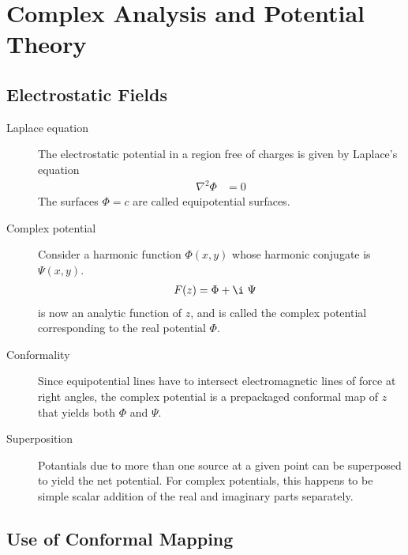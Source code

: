 \chapter{Complex Analysis and Potential Theory}

\section{Electrostatic Fields}

\begin{description}
    \item[Laplace equation] The electrostatic potential in a region free of charges is
        given by Laplace's equation
        \begin{align}
            \nabla^2 \Phi & = 0
        \end{align}
        The surfaces $ \Phi = c $ are called equipotential surfaces.

    \item[Complex potential] Consider a harmonic function $ \Phi(x, y) $ whose
        harmonic conjugate is $ \Psi(x, y) $.
        \begin{align}
            F(z) & = \Phi + \i\ \Psi
        \end{align}
        is now an analytic function of $ z $, and is called the complex potential
        corresponding to the real potential $ \Phi $.

    \item[Conformality] Since equipotential lines have to intersect electromagnetic
        lines of force at right angles, the complex potential is a prepackaged conformal
        map of $ z $ that yields both $ \Phi $ and $ \Psi $.

    \item[Superposition] Potantials due to more than one source at a given point can
        be superposed to yield the net potential. For complex potentials, this happens to
        be simple scalar addition of the real and imaginary parts separately.
\end{description}

\section{Use of Conformal Mapping}

